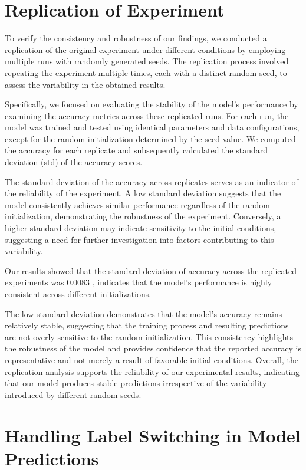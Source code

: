 \documentclass{article}
\begin{document}
\section{Replication of Experiment}

To verify the consistency and robustness of our findings, we conducted a replication of the original experiment under different conditions by employing multiple runs with randomly generated seeds. The replication process involved repeating the experiment multiple times, each with a distinct random seed, to assess the variability in the obtained results.

Specifically, we focused on evaluating the stability of the model's performance by examining the accuracy metrics across these replicated runs. For each run, the model was trained and tested using identical parameters and data configurations, except for the random initialization determined by the seed value. We computed the accuracy for each replicate and subsequently calculated the standard deviation (std) of the accuracy scores.

The standard deviation of the accuracy across replicates serves as an indicator of the reliability of the experiment. A low standard deviation suggests that the model consistently achieves similar performance regardless of the random initialization, demonstrating the robustness of the experiment. Conversely, a higher standard deviation may indicate sensitivity to the initial conditions, suggesting a need for further investigation into factors contributing to this variability.

Our results showed that the standard deviation of accuracy across the replicated experiments was 
0.0083
, indicates that the model’s performance is highly consistent across different initializations.

The low standard deviation demonstrates that the model’s accuracy remains relatively stable, suggesting
that the training process and resulting predictions are not overly sensitive to the random initialization. 
This consistency highlights the robustness of the model and provides confidence that the
reported accuracy is representative and not merely a result of favorable initial conditions.
Overall, the replication analysis supports the reliability of our experimental results, indicating that our
model produces stable predictions irrespective of the variability introduced by different random seeds.

\section{Handling Label Switching in Model Predictions}
\end{document}
